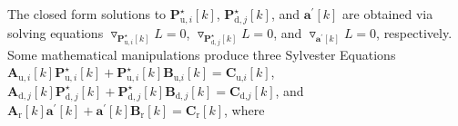 \documentclass[9pt,journal]{IEEEtran}
\newcommand{\paren}[1]{\left({#1}\right)}
\newcommand{\bracket}[1]{{\left [{#1}\right ]}}
\theoremstyle{definition}
\begin{document}
The closed form solutions to  $\mathbf{P}^\star_{\textrm{u},i}\bracket{k}$, $\mathbf{P}^\star_{\textrm{d},j}\bracket{k}$, and $\mathbf{a}^\prime\bracket{k}$ are obtained via solving equations $\triangledown_{\mathbf{P}^\star_{\textrm{u},i}\bracket{k}}L=0$, $\triangledown_{\mathbf{P}^\star_{\textrm{d},j}\bracket{k}}L=0$, and $\triangledown_{\mathbf{a}^\prime\bracket{k}}L=0$, respectively.
Some mathematical manipulations produce three Sylvester Equations $\mathbf{A}_{\textrm{u},i}\bracket{k}\mathbf{P}^\star_{\textrm{u},i}\bracket{k}+\mathbf{P}^\star_{\textrm{u},i}\bracket{k}\mathbf{B}_{\textrm{u,}i}\bracket{k}=\mathbf{C}_{\textrm{u,}i}\bracket{k}$, $\mathbf{A}_{\textrm{d},j}\bracket{k}\mathbf{P}^\star_{\textrm{d},j}\bracket{k}+\mathbf{P}^\star_{\textrm{d},j}\bracket{k}\mathbf{B}_{\textrm{d},j}\bracket{k}=\mathbf{C}_{\textrm{d,}j}\bracket{k}$, and $\mathbf{A}_{\textrm{r}}\bracket{k}\mathbf{a}^\prime\bracket{k}+\mathbf{a}^\prime\bracket{k}\mathbf{B}_{\textrm{r}}\bracket{k}=\mathbf{C}_{\textrm{r}}\bracket{k}$, where \par\indent\small
\end{document}
